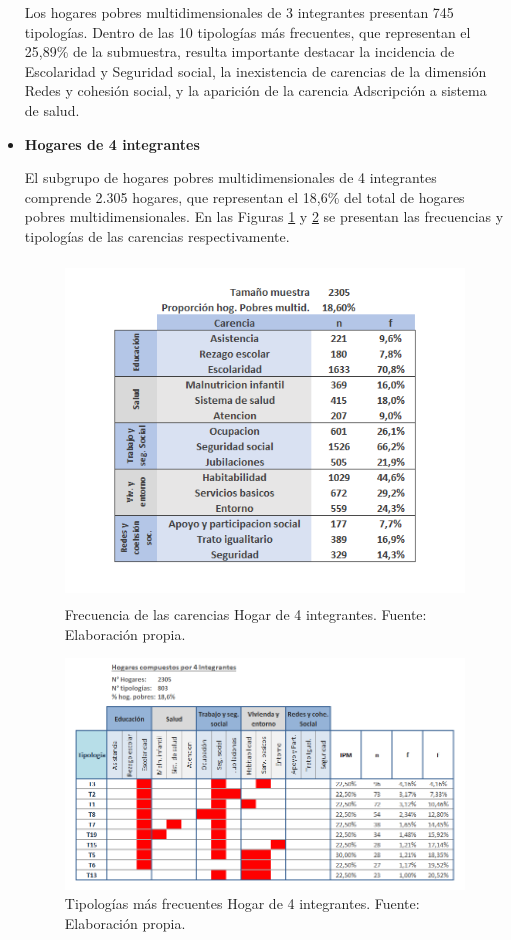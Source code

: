 \documentclass[12pt,letterpaper,spanish]{article}
\begin{document}
\begin{itemize}
    Los hogares pobres multidimensionales de 3 integrantes presentan 745 tipologías. Dentro de las 10 tipologías más frecuentes, que representan el 25,89\% de la submuestra, resulta importante destacar la incidencia de Escolaridad y Seguridad social, la inexistencia de carencias de la dimensión Redes y cohesión social, y la aparición de la carencia Adscripción a sistema de salud.
    
    \item \textbf{Hogares de 4 integrantes}
    
    El subgrupo de hogares pobres multidimensionales de 4 integrantes comprende 2.305 hogares, que representan el 18,6\% del total de hogares pobres multidimensionales. En las Figuras \ref{fren4} y \ref{tipn4} se presentan las frecuencias y tipologías de las carencias respectivamente.
   
    \begin{figure}[H]
        \centering
        \includegraphics[height=9cm]{HOGARES/tabla_num4.png}
        \caption{Frecuencia de las carencias Hogar de 4 integrantes. Fuente: Elaboración propia.}
        \label{fren4}
    \end{figure}
    \begin{figure}[H]
        \centering
        \includegraphics[width=\textwidth]{Mati N/n=4.png}
        \caption{Tipologías más frecuentes Hogar de 4 integrantes. Fuente: Elaboración propia.}
        \label{tipn4}
    \end{figure}
    

\end{itemize}
\end{document}
